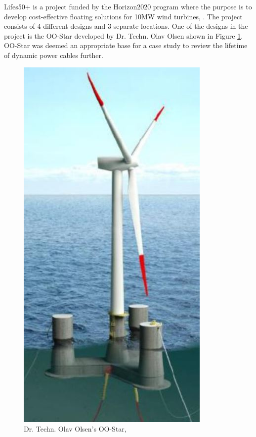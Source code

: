 \newline
\newline
Lifes50+ is a project funded by the Horizon2020 program where the purpose is to develop cost-effective floating solutions for 10MW wind turbines, \cite{Horizon2010}. The project consists of 4 different designs and 3 separate locations. One of the designs in the project is the OO-Star developed by Dr. Techn. Olav Olsen shown in Figure \ref{fig:oostarintro}. OO-Star was deemed an appropriate base for a case study to review the lifetime of dynamic power cables further.
\begin{figure}[H]
\centering
\includegraphics[scale=0.5]{figures/oostar}
\caption[$\; \:$Dr. Techn. Olav Olsen's OO-Star]{Dr. Techn. Olav Olsen's OO-Star, \cite{Lifes50+D4.2} }
 \label{fig:oostarintro}
\end{figure}



